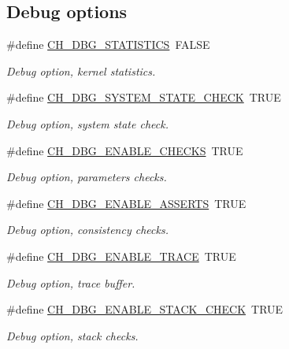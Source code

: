 \subsection*{Debug options}
\begin{DoxyCompactItemize}
\item 
\#define \hyperlink{group__config_ga01fa48cf866c26bad886a15c37571f99}{C\+H\+\_\+\+D\+B\+G\+\_\+\+S\+T\+A\+T\+I\+S\+T\+I\+CS}~F\+A\+L\+SE
\begin{DoxyCompactList}\small\item\em Debug option, kernel statistics. \end{DoxyCompactList}\item 
\#define \hyperlink{group__config_ga10db71bc25605169dddc82c1604b0a16}{C\+H\+\_\+\+D\+B\+G\+\_\+\+S\+Y\+S\+T\+E\+M\+\_\+\+S\+T\+A\+T\+E\+\_\+\+C\+H\+E\+CK}~T\+R\+UE
\begin{DoxyCompactList}\small\item\em Debug option, system state check. \end{DoxyCompactList}\item 
\#define \hyperlink{group__config_gaef984ca3bfd8a71478ad55ce6e56a8bb}{C\+H\+\_\+\+D\+B\+G\+\_\+\+E\+N\+A\+B\+L\+E\+\_\+\+C\+H\+E\+C\+KS}~T\+R\+UE
\begin{DoxyCompactList}\small\item\em Debug option, parameters checks. \end{DoxyCompactList}\item 
\#define \hyperlink{group__config_gad602fd2546073869a10859158d865b9b}{C\+H\+\_\+\+D\+B\+G\+\_\+\+E\+N\+A\+B\+L\+E\+\_\+\+A\+S\+S\+E\+R\+TS}~T\+R\+UE
\begin{DoxyCompactList}\small\item\em Debug option, consistency checks. \end{DoxyCompactList}\item 
\#define \hyperlink{group__config_ga8bc4cfd861131aeb3c880347d0068229}{C\+H\+\_\+\+D\+B\+G\+\_\+\+E\+N\+A\+B\+L\+E\+\_\+\+T\+R\+A\+CE}~T\+R\+UE
\begin{DoxyCompactList}\small\item\em Debug option, trace buffer. \end{DoxyCompactList}\item 
\#define \hyperlink{group__config_gab93d9ee904f15d4f2c26ef2a1394a1d7}{C\+H\+\_\+\+D\+B\+G\+\_\+\+E\+N\+A\+B\+L\+E\+\_\+\+S\+T\+A\+C\+K\+\_\+\+C\+H\+E\+CK}~T\+R\+UE
\begin{DoxyCompactList}\small\item\em Debug option, stack checks. \end{DoxyCompactList}\item 

\end{DoxyCompactItemize}
